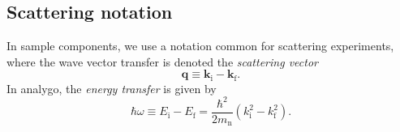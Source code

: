 

\subsection{Scattering notation}
In sample components, we use a notation common for scattering experiments,
where the wave vector transfer is denoted the {\em scattering vector}
\begin{equation} \label{eq:q-transfer}
\boldsymbol{q} \equiv \boldsymbol{k}_\mathrm{i} - \boldsymbol{k}_\mathrm{f} .
\end{equation}
In analygo, the {\em energy transfer} is given by
\begin{equation} \label{eq:w-transfer}
\hbar \omega \equiv E_\mathrm{i} - E_\mathrm{f} =
\frac{\hbar^2}{2 m_\mathrm{n}} \left( k_\mathrm{i}^2 - k_\mathrm{f}^2 \right) .
\end{equation}

